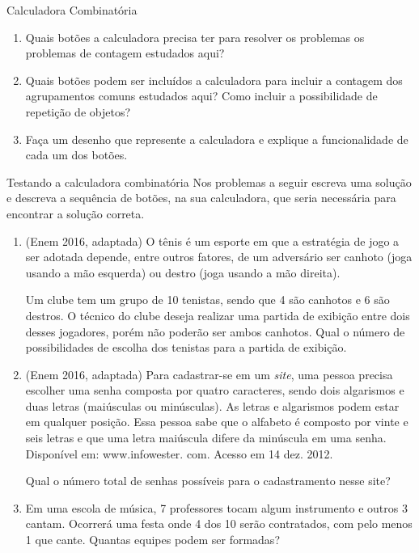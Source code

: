 \begin{task}{Calculadora Combinatória}
\begin{enumerate}
\item Quais botões a calculadora precisa ter para resolver os problemas os problemas de contagem estudados aqui? 

\item Quais botões podem ser incluídos a calculadora para incluir a contagem dos agrupamentos comuns estudados aqui? Como incluir a possibilidade de repetição de objetos?


\item Faça um desenho que represente a calculadora e explique a funcionalidade de cada um dos botões.

\end{enumerate}
\end{task}

\begin{task}{Testando a calculadora combinatória}
Nos problemas a seguir escreva uma solução e descreva a sequência de botões, na sua calculadora, que seria necessária para encontrar a solução correta.

\begin{enumerate}
\item (Enem 2016, adaptada) O tênis é um esporte em que a estratégia de jogo a ser adotada depende, entre outros fatores, de um adversário ser canhoto (joga usando a mão esquerda) ou destro (joga usando a mão direita). 

Um clube tem um grupo de 10 tenistas, sendo que 4 são canhotos e 6 são destros. O técnico do clube deseja realizar uma partida de exibição entre dois desses jogadores, porém não poderão ser ambos canhotos. Qual o número de possibilidades de escolha dos tenistas para a partida de exibição.  

\item (Enem 2016, adaptada) Para cadastrar-se em um \textit{site}, uma pessoa precisa escolher uma senha composta por quatro caracteres, sendo dois algarismos e duas letras (maiúsculas ou minúsculas). As letras e algarismos podem estar em qualquer posição. Essa pessoa sabe que o alfabeto é composto por vinte e seis letras e que uma letra maiúscula difere da minúscula em uma senha. 
 {Disponível em: www.infowester. com. Acesso em 14 dez. 2012.}
 
Qual o número total de senhas possíveis para o cadastramento nesse site?

\item Em uma escola de música, 7 professores tocam algum instrumento e outros 3 cantam. Ocorrerá uma festa onde 4 dos 10 serão contratados, com pelo menos 1 que cante. Quantas equipes podem ser formadas?

\end{enumerate}
\end{task}

